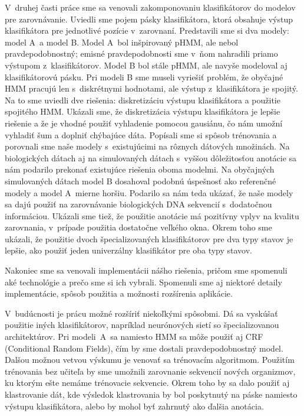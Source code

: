 V~druhej časti práce sme sa venovali zakomponovaniu klasifikátorov do modelov pre zarovnávanie. Uviedli sme pojem pásky klasifikátora, ktorá obsahuje výstup klasifikátora pre jednotlivé pozície v~zarovnaní. Predstavili sme si dva modely: model A~a model B.
Model A~bol inšpirovaný pHMM, ale nebol pravdepodobnostný; emisné pravdepodobnosti sme v~ňom nahradili priamo výstupom z~klasifikátorov.
Model B bol stále pHMM, ale navyše modeloval aj klasifikátorovú pásku.
Pri modeli B sme museli vyriešiť problém, že obyčajné HMM pracujú len s~diskrétnymi hodnotami, ale výstup z~klasifikátora je spojitý. Na to sme uviedli dve riešenia: diskretizáciu výstupu klasifikátora a použitie spojitého HMM.
Ukázali sme, že diskretizácia výstupu klasifikátora je lepšie riešenie a že je vhodné použiť vyhladenie pomocou gausiánu, čo nám umožní vyhladiť šum a doplniť chýbajúce dáta. Popísali sme si spôsob trénovania a porovnali sme naše modely s~existujúcimi na rôznych dátových množinách.
Na biologických dátach aj na simulovaných dátach s~vyššou dôležitosťou anotácie sa nám podarilo prekonať existujúce riešenia oboma modelmi. Na obyčajných simulovaných dátach model B dosahoval podobnú úspešnosť ako referenčné modely a model A~mierne horšiu. Podarilo sa nám teda ukázať, že naše modely sa dajú použiť na zarovnávanie biologických DNA sekvencií s~dodatočnou informáciou. Ukázali sme tiež, že použitie anotácie má pozitívny vplyv na kvalitu zarovnania, v~prípade použitia dostatočne veľkého okna. Okrem toho sme ukázali, že použitie dvoch špecializovaných klasifikátorov pre dva typy stavov je lepšie, ako použiť jeden univerzálny klasifikátor pre oba typy stavov.

Nakoniec sme sa venovali implementácii nášho riešenia, pričom sme spomenuli aké technológie a prečo sme si ich vybrali. Spomenuli sme aj niektoré detaily implementácie, spôsob použitia a možnosti rozšírenia aplikácie.

V~budúcnosti je prácu možné rozšíriť niekoľkými spôsobmi. Dá sa vyskúšať použitie iných klasifikátorov, napríklad neurónových sietí so špecializovanou architektúrov. Pri modeli~A~sa namiesto HMM sa môže použiť aj CRF (Conditional Random Fields), čím by sme dostali pravdepodobnostný model.
Dalšou možnou vetvou výskumu je venovať sa trénovacím algoritmom. Použitím trénovania bez učiteľa by sme umožnili zarovnanie sekvencií nových organizmov, ku ktorým ešte nemáme trénovacie sekvencie. Okrem toho by sa dalo použiť aj klastrovanie dát, kde výsledok klastrovania by bol poskytnutý na páske namiesto výstupu klasifikátora, alebo by mohol byť zahrnutý ako ďalšia anotácia.
